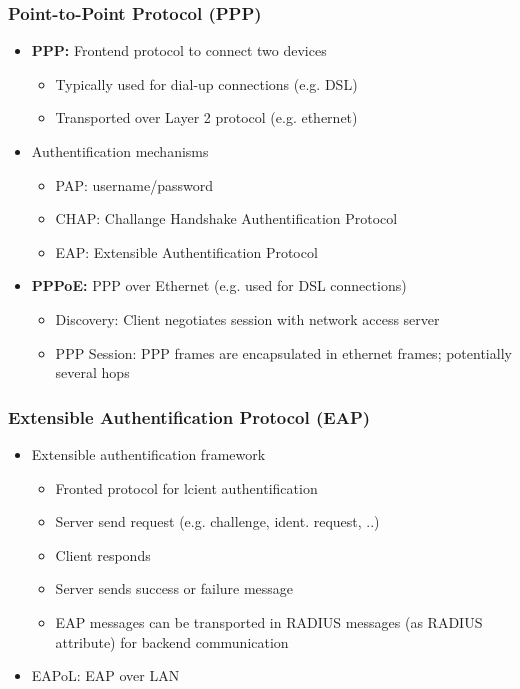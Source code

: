 \subsubsection{Point-to-Point Protocol (PPP)}
\begin{itemize}
  \item \textbf{PPP: }Frontend protocol to connect two devices
    \begin{itemize}
      \item Typically used for dial-up connections (e.g. DSL)
      \item Transported over Layer 2 protocol (e.g. ethernet)
    \end{itemize}
  \item Authentification mechanisms
    \begin{itemize}
      \item PAP: username/password
      \item CHAP: Challange Handshake Authentification Protocol
      \item EAP: Extensible Authentification Protocol
    \end{itemize}
  \item \textbf{PPPoE: }PPP over Ethernet (e.g. used for DSL connections)
    \begin{itemize}
      \item Discovery: Client negotiates session with network access server
      \item PPP Session: PPP frames are encapsulated in ethernet frames; potentially several hops
    \end{itemize}
\end{itemize}

\subsubsection{Extensible Authentification Protocol (EAP)}
\begin{itemize}
  \item Extensible authentification framework
    \begin{itemize}
      \item Fronted protocol for lcient authentification
      \item Server send request (e.g. challenge, ident. request, ..)
      \item Client responds
      \item Server sends success or failure message
      \item EAP messages can be transported in RADIUS messages (as RADIUS attribute) for backend communication
    \end{itemize}
  \item EAPoL: EAP over LAN
\end{itemize}


